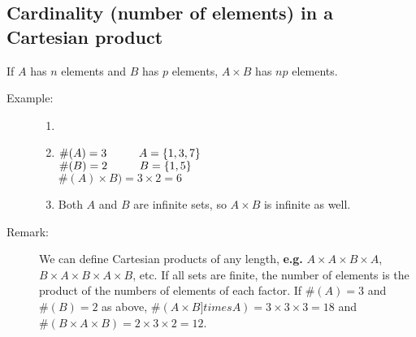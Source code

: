 \documentclass[10pt]{article}
\begin{document}
	\subsection{Cardinality (number of elements) in a Cartesian product}
	If $A$ has $n$ elements and $B$ has $p$ elements, $A \times B$ has $np$ elements.
	\pagebreak
	\begin{description}
		\item[Example:]
		\begin{enumerate}
			\item[]
			\item $ \#(A) = 3 \hspace{10mm} A = \{1, 3, 7\}$ \\
			$\#(B) = 2 \hspace{10mm} B = \{1, 5\}$ \\
			$\#(A) \times B) = 3 \times 2 = 6$
			\item Both $A$ and $B$ are infinite sets, so $A \times B$ is infinite as well.
		\end{enumerate}
		\item[Remark:] We can define Cartesian products of any length, \textbf{e.g.} $A \times A \times B \times A$, $B \times A \times B \times A \times B$, etc. If all sets are finite, the number of elements is the product of the numbers of elements of each factor. If $\#(A) = 3$ and $\#(B) = 2$ as above, $\#(A \times B ]times A) = 3 \times 3 \times 3 = 18$ and $\#(B \times A \times B) = 2 \times 3 \times 2 = 12$.
	\end{description}
	
\end{document}
